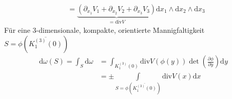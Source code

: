 \begin{example}
\begin{enum-arab}
\begin{align*}
        &= \underbrace{(\partial_{x_1} V_1 + \partial_{x_2} V_2 + \partial_{x_3} V_3)}_{=\mathrm{div} V} \mathrm d x_1 \wedge \mathrm d x_2 \wedge \mathrm d x_3
      \end{align*}
      Für eine $3$-dimensionale, kompakte, orientierte Mannigfaltigkeit $S = \phi(\overline{K_1^{(3)}(0)})$
      \begin{align*}
        \mathrm d \omega(S) = \int_S \mathrm d \omega &= \int_{K_1^{(3)}(0)} \mathrm{div} V(\phi(y)) \det(\tfrac{\partial \phi}{\partial y}) \mathrm d y \\
        &= \pm \int\limits_{S = \phi(\overline{K_1^{(3)}(0)})} \mathrm{div} V(x) \mathrm d x
      \end{align*}
  \end{enum-arab}
\end{example}

